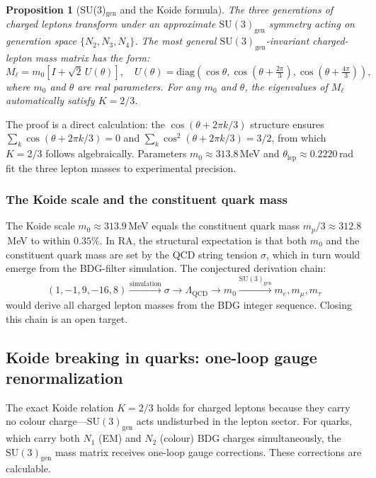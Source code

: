 \documentclass[11pt]{article}
\newtheorem{proposition}{Proposition}
\begin{document}
\begin{proposition}[SU(3)$_{\mathrm{gen}}$ and the Koide formula]
The three generations of charged leptons transform under an approximate $\mathrm{SU}(3)_{\mathrm{gen}}$ symmetry acting on generation space $\{N_2,N_3,N_4\}$. The most general $\mathrm{SU}(3)_{\mathrm{gen}}$-invariant charged-lepton mass matrix has the form:
\begin{equation}
M_\ell = m_0\left[I+\sqrt{2}\,U(\theta)\right], \quad U(\theta)=\mathrm{diag}\!\left(\cos\theta,\cos(\theta+\tfrac{2\pi}{3}),\cos(\theta+\tfrac{4\pi}{3})\right),
\end{equation}
where $m_0$ and $\theta$ are real parameters. For any $m_0$ and $\theta$, the eigenvalues of $M_\ell$ automatically satisfy $K=2/3$.
\end{proposition}

The proof is a direct calculation: the $\cos(\theta+2\pi k/3)$ structure ensures $\sum_k\cos(\theta+2\pi k/3)=0$ and $\sum_k\cos^2(\theta+2\pi k/3)=3/2$, from which $K=2/3$ follows algebraically. Parameters $m_0\approx 313.8$\,MeV and $\theta_{\mathrm{lep}}\approx 0.2220$\,rad fit the three lepton masses to experimental precision.

\subsubsection{The Koide scale and the constituent quark mass}

The Koide scale $m_0\approx 313.9$\,MeV equals the constituent quark mass $m_p/3\approx 312.8$\,MeV to within $0.35\%$. In RA, the structural expectation is that both $m_0$ and the constituent quark mass are set by the QCD string tension $\sigma$, which in turn would emerge from the BDG-filter simulation. The conjectured derivation chain:
\begin{equation}
(1,-1,9,-16,8)\xrightarrow{\text{simulation}}\sigma\longrightarrow\Lambda_{\mathrm{QCD}}\longrightarrow m_0\xrightarrow{\mathrm{SU}(3)_{\mathrm{gen}}}m_e,m_\mu,m_\tau
\end{equation}
would derive all charged lepton masses from the BDG integer sequence. Closing this chain is an open target.

\subsection{Koide breaking in quarks: one-loop gauge renormalization}

The exact Koide relation $K=2/3$ holds for charged leptons because they carry no colour charge---$\mathrm{SU}(3)_{\mathrm{gen}}$ acts undisturbed in the lepton sector. For quarks, which carry both $N_1$ (EM) and $N_2$ (colour) BDG charges simultaneously, the $\mathrm{SU}(3)_{\mathrm{gen}}$ mass matrix receives one-loop gauge corrections. These corrections are calculable.
\end{document}

